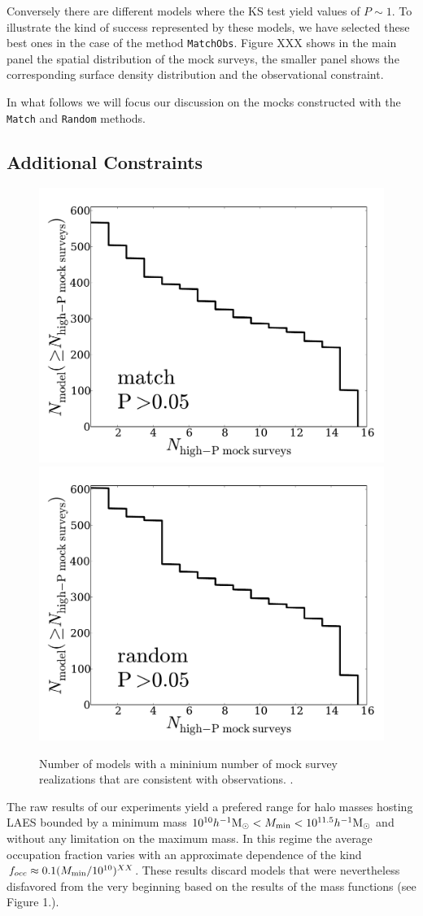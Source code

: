 \documentclass[usenatbib]{mn2e}
\newcommand{\hMsun}{{\ifmmode{h^{-1}{\rm {M_{\odot}}}}\else{$h^{-1}{\rm{M_{\odot}}}$}\fi}}
\begin{document}
Conversely there are different models where the KS test yield values of
$P\sim 1$. To illustrate the kind of success represented by these
models, we have selected these best ones in the case of the method
{\tt{MatchObs}}. Figure XXX shows in the main panel the spatial
distribution of the mock surveys, the smaller panel shows the
corresponding surface density distribution and the observational
constraint.  

In what follows we will focus our discussion on the mocks constructed
with the {\tt{Match}} and {\tt{Random}} methods. 

\subsection{Additional Constraints}

\begin{figure}
\begin{center}
\includegraphics[width=0.46\linewidth,angle=0]{./plots/Fig4_match_P5.pdf}
\hspace{5mm}
\includegraphics[width=0.46\linewidth,angle=0]{./plots/Fig4_random_P5.pdf}
\end{center} 
\caption{ Number of models with a mininium number of mock survey
  realizations that are consistent with observations.
  \label{figure:high_success_rate}.}  
\end{figure}

The raw results of our experiments yield a prefered range for
halo masses hosting LAES bounded by a minimum mass $10^{10}\hMsun<M_{\rm
  min}<10^{11.5}\hMsun$ and without any limitation on the  maximum
mass. In this regime the average occupation fraction varies with an
approximate dependence of the kind $f_{occ}\approx 0.1 (M_{\rm
  min}/10^{10})^{XX}$. These results discard models that were
nevertheless disfavored from the very beginning based on the results
of the mass functions (see Figure 1.).  
 
\end{document}
